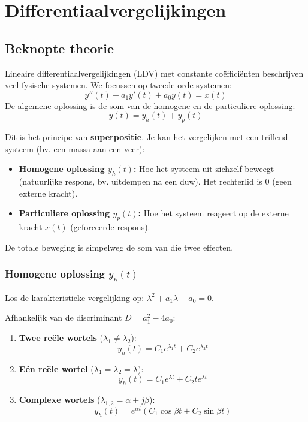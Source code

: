 \section{Differentiaalvergelijkingen}

\subsection{Beknopte theorie}

Lineaire differentiaalvergelijkingen (LDV) met constante coëfficiënten 
beschrijven veel fysische systemen. We focussen op tweede-orde systemen:
\[ y''(t) + a_1 y'(t) + a_0 y(t) = x(t) \]
De algemene oplossing is de som van de homogene en de particuliere oplossing:
\[ y(t) = y_h(t) + y_p(t) \]

\begin{conceptbox}
Dit is het principe van \textbf{superpositie}. Je kan het vergelijken met een trillend systeem (bv. een massa aan een veer):
\begin{itemize}
    \item \textbf{Homogene oplossing $y_h(t)$:} Hoe het systeem uit zichzelf beweegt (natuurlijke respons, bv. uitdempen na een duw). Het rechterlid is 0 (geen externe kracht).
    \item \textbf{Particuliere oplossing $y_p(t)$:} Hoe het systeem reageert op de externe kracht $x(t)$ (geforceerde respons).
\end{itemize}
De totale beweging is simpelweg de som van die twee effecten.
\end{conceptbox}

\subsubsection{Homogene oplossing $y_h(t)$}
Los de karakteristieke vergelijking op: $\lambda^2 + a_1\lambda + a_0 = 0$.

\begin{theorie}
Afhankelijk van de discriminant $D = a_1^2 - 4a_0$:
\begin{enumerate}
    \item \textbf{Twee reële wortels} ($\lambda_1 \neq \lambda_2$):
    \[ y_h(t) = C_1 e^{\lambda_1 t} + C_2 e^{\lambda_2 t} \]
    
    \item \textbf{Eén reële wortel} ($\lambda_1 = \lambda_2 = \lambda$):
    \[ y_h(t) = C_1 e^{\lambda t} + C_2 t e^{\lambda t} \]
    
    \item \textbf{Complexe wortels} ($\lambda_{1,2} = \alpha \pm j\beta$):
    \[ y_h(t) = e^{\alpha t} (C_1 \cos \beta t + C_2 \sin \beta t) \]
\end{enumerate}
\end{theorie}

